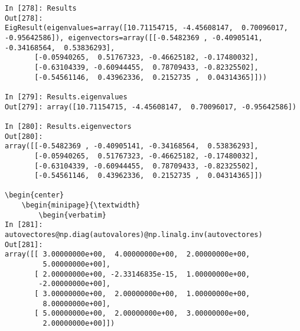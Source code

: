 \begin{center}
\begin{minipage}{0.9\textwidth}
\begin{verbatim}
In [278]: Results
Out[278]: 
EigResult(eigenvalues=array([10.71154715, -4.45608147,  0.70096017,
-0.95642586]), eigenvectors=array([[-0.5482369 , -0.40905141, -0.34168564,  0.53836293],
       [-0.05940265,  0.51767323, -0.46625182, -0.17480032],
       [-0.63104339, -0.60944455,  0.78709433, -0.82325502],
       [-0.54561146,  0.43962336,  0.2152735 ,  0.04314365]]))

In [279]: Results.eigenvalues
Out[279]: array([10.71154715, -4.45608147,  0.70096017, -0.95642586])

In [280]: Results.eigenvectors
Out[280]: 
array([[-0.5482369 , -0.40905141, -0.34168564,  0.53836293],
       [-0.05940265,  0.51767323, -0.46625182, -0.17480032],
       [-0.63104339, -0.60944455,  0.78709433, -0.82325502],
       [-0.54561146,  0.43962336,  0.2152735 ,  0.04314365]])

\begin{center}
	\begin{minipage}{\textwidth}
		\begin{verbatim}
In [281]: autovectores@np.diag(autovalores)@np.linalg.inv(autovectores)
Out[281]: 
array([[ 3.00000000e+00,  4.00000000e+00,  2.00000000e+00,
         5.00000000e+00],
       [ 2.00000000e+00, -2.33146835e-15,  1.00000000e+00,
        -2.00000000e+00],
       [ 3.00000000e+00,  2.00000000e+00,  1.00000000e+00,
         8.00000000e+00],
       [ 5.00000000e+00,  2.00000000e+00,  3.00000000e+00,
         2.00000000e+00]])

    \end{verbatim}    
    \end{minipage}
\end{center}


